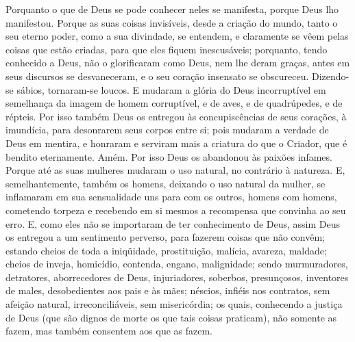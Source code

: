 Porquanto o que de Deus se pode conhecer neles se manifesta,
porque Deus lho manifestou. Porque as suas coisas invisíveis,
desde a criação do mundo, tanto o seu eterno poder, como a sua
divindade, se entendem, e claramente se vêem pelas coisas que estão
criadas, para que eles fiquem inescusáveis; porquanto, tendo
conhecido a Deus, não o glorificaram como Deus, nem lhe deram
graças, antes em seus discursos se desvaneceram, e o seu coração
insensato se obscureceu. Dizendo-se sábios, tornaram-se
loucos. E mudaram a glória do Deus incorruptível em
semelhança da imagem de homem corruptível, e de aves, e de
quadrúpedes, e de répteis. Por isso também Deus os entregou
às concupiscências de seus corações, à imundícia, para desonrarem
seus corpos entre si; pois mudaram a verdade de Deus em
mentira, e honraram e serviram mais a criatura do que o Criador, que
é bendito eternamente. Amém. Por isso Deus os abandonou às
paixões infames. Porque até as suas mulheres mudaram o uso natural,
no contrário à natureza. E, semelhantemente, também os
homens, deixando o uso natural da mulher, se inflamaram em sua
sensualidade uns para com os outros, homens com homens, cometendo
torpeza e recebendo em si mesmos a recompensa que convinha ao seu
erro. E, como eles não se importaram de ter conhecimento de
Deus, assim Deus os entregou a um sentimento perverso, para fazerem
coisas que não convêm; estando cheios de toda a iniqüidade,
prostituição, malícia, avareza, maldade; cheios de inveja,
homicídio, contenda, engano, malignidade; sendo murmuradores,
detratores, aborrecedores de Deus, injuriadores, soberbos,
presunçosos, inventores de males, desobedientes aos pais e às mães;
néscios, infiéis nos contratos, sem afeição natural,
irreconciliáveis, sem misericórdia; os quais, conhecendo a
justiça de Deus (que são dignos de morte os que tais coisas
praticam), não somente as fazem, mas também consentem aos que as
fazem.

\medskip

